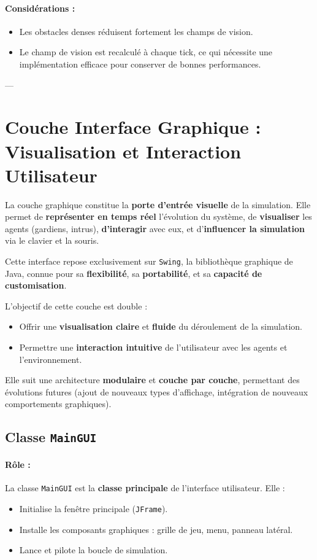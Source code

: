     

\paragraph{Considérations :}
\begin{itemize}
    \item Les obstacles denses réduisent fortement les champs de vision.
    \item Le champ de vision est recalculé à chaque tick, ce qui nécessite une implémentation efficace pour conserver de bonnes performances.
\end{itemize}

---
\section{Couche Interface Graphique : Visualisation et Interaction Utilisateur}

La couche graphique constitue la \textbf{porte d'entrée visuelle} de la simulation.  
Elle permet de \textbf{représenter en temps réel} l'évolution du système, de \textbf{visualiser} les agents (gardiens, intrus), \textbf{d'interagir} avec eux, et d'\textbf{influencer la simulation} via le clavier et la souris.

Cette interface repose exclusivement sur \texttt{Swing}, la bibliothèque graphique de Java, connue pour sa \textbf{flexibilité}, sa \textbf{portabilité}, et sa \textbf{capacité de customisation}.

L'objectif de cette couche est double :
\begin{itemize}
    \item Offrir une \textbf{visualisation claire} et \textbf{fluide} du déroulement de la simulation.
    \item Permettre une \textbf{interaction intuitive} de l'utilisateur avec les agents et l'environnement.
\end{itemize}

Elle suit une architecture \textbf{modulaire} et \textbf{couche par couche}, permettant des évolutions futures (ajout de nouveaux types d’affichage, intégration de nouveaux comportements graphiques).

\bigskip

\subsection{ Classe \texttt{MainGUI}}

\paragraph{Rôle :}  
La classe \texttt{MainGUI} est la \textbf{classe principale} de l’interface utilisateur.  
Elle :
\begin{itemize}
    \item Initialise la fenêtre principale (\texttt{JFrame}).
    \item Installe les composants graphiques : grille de jeu, menu, panneau latéral.
    \item Lance et pilote la boucle de simulation.
\end{itemize}

